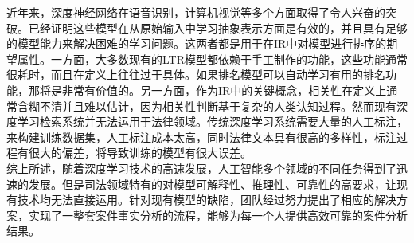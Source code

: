 近年来，深度神经网络在语音识别\cite{hinton2012deep}，计算机视觉\cite{krizhevsky2012imagenet,lecun2015deep}等多个方面取得了令人兴奋的突破。已经证明这些模型在从原始输入中学习抽象表示方面是有效的，并且具有足够的模型能力来解决困难的学习问题。这两者都是用于在IR中对模型进行排序的期望属性。一方面，大多数现有的LTR模型都依赖于手工制作的功能，这些功能通常很耗时，而且在定义上往往过于具体。如果排名模型可以自动学习有用的排名功能，那将是非常有价值的。另一方面，作为IR中的关键概念，相关性在定义上通常含糊不清并且难以估计，因为相关性判断基于复杂的人类认知过程。然而现有深度学习检索系统并无法运用于法律领域。传统深度学习系统需要大量的人工标注，来构建训练数据集，人工标注成本太高，同时法律文本具有很高的多样性，标注过程有很大的偏差，将导致训练的模型有很大误差。\\


综上所述，随着深度学习技术的高速发展，人工智能多个领域的不同任务得到了迅速的发展。但是司法领域特有的对模型可解释性、推理性、可靠性的高要求，让现有技术均无法直接运用。针对现有模型的缺陷，团队经过努力提出了相应的解决方案，实现了一整套案件事实分析的流程，能够为每一个人提供高效可靠的案件分析结果。





